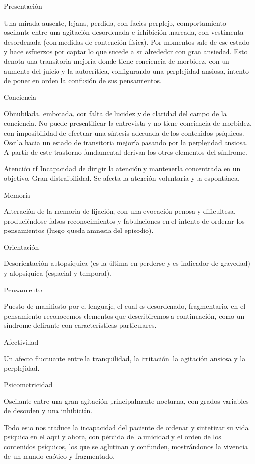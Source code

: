 Presentación

Una mirada ausente, lejana, perdida, con facies perplejo, comportamiento oscilante entre una agitación desordenada e inhibición marcada, con vestimenta desordenada (con medidas de contención física). Por momentos sale de ese estado y hace esfuerzos por captar lo que sucede a su alrededor con gran ansiedad. Esto denota una transitoria mejoría donde tiene conciencia de morbidez, con un aumento del juicio y la autocrítica, configurando una perplejidad ansiosa, intento de poner en orden la confusión de sus pensamientos.

Conciencia

Obnubilada, embotada, con falta de lucidez y de claridad del campo de la conciencia. No puede presentificar la entrevista y no tiene conciencia de morbidez, con imposibilidad de efectuar una síntesis adecuada de los contenidos psíquicos. Oscila hacia un estado de transitoria mejoría pasando por la perplejidad ansiosa. A partir de este trastorno fundamental derivan los otros elementos del síndrome.

Atención
rf
Incapacidad de dirigir la atención y mantenerla concentrada en un objetivo. Gran distraibilidad. Se afecta la atención voluntaria y la espontánea.

Memoria

Alteración de la memoria de fijación, con una evocación penosa y dificultosa, produciéndose falsos reconocimientos y fabulaciones en el intento de ordenar los pensamientos (luego queda amnesia del episodio).

Orientación

Desorientación autopsíquica (es la última en perderse y es indicador de gravedad) y alopsíquica (espacial y temporal).

Pensamiento

Puesto de manifiesto por el lenguaje, el cual es desordenado, fragmentario. en el pensamiento reconocemos elementos que describiremos a continuación, como un síndrome delirante con características particulares.

Afectividad

Un afecto fluctuante entre la tranquilidad, la irritación, la agitación ansiosa y la perplejidad.

Psicomotricidad

Oscilante entre una gran agitación principalmente nocturna, con grados variables de desorden y una inhibición.

Todo esto nos traduce la incapacidad del paciente de ordenar y sintetizar su vida psíquica en el aquí y ahora, con pérdida de la unicidad y el orden de los contenidos psíquicos, los que se aglutinan y confunden, mostrándonos la vivencia de un mundo caótico y fragmentado.

